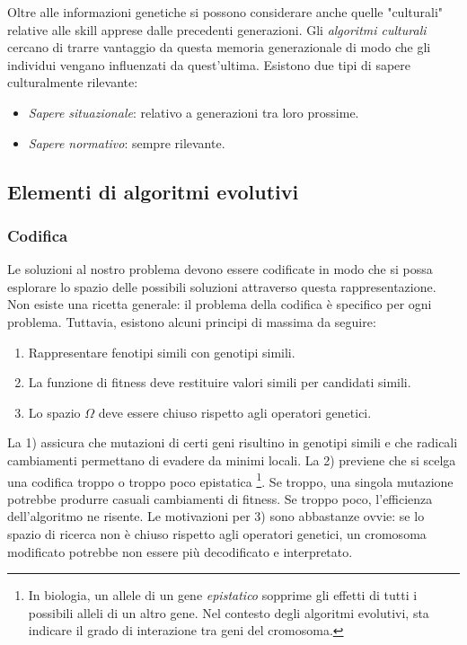 \documentclass[10pt,a4paper]{article}
\begin{document}
Oltre alle informazioni genetiche si possono considerare anche quelle "culturali" relative alle skill apprese dalle precedenti generazioni. Gli \emph{algoritmi culturali} cercano di trarre vantaggio da questa memoria generazionale di modo che gli individui vengano influenzati da quest'ultima. Esistono due tipi di sapere culturalmente rilevante:

\begin{itemize}
\item{\emph{Sapere situazionale}: relativo a generazioni tra loro prossime.}
\item{\emph{Sapere normativo}: sempre rilevante.}
\end{itemize}

\subsection{Elementi di algoritmi evolutivi}

\subsubsection{Codifica}

Le soluzioni al nostro problema devono essere codificate in modo che si possa esplorare lo spazio delle possibili soluzioni attraverso questa rappresentazione. Non esiste una ricetta generale: il problema della codifica è specifico per ogni problema. Tuttavia, esistono alcuni principi di massima da seguire:

\begin{enumerate}
\item{Rappresentare fenotipi simili con genotipi simili.}
\item{La funzione di fitness deve restituire valori simili per candidati simili.}
\item{Lo spazio $\Omega$ deve essere chiuso rispetto agli operatori genetici.}
\end{enumerate}

La 1) assicura che mutazioni di certi geni risultino in genotipi simili e che radicali cambiamenti permettano di evadere da minimi locali. La 2) previene che si scelga una codifica troppo o troppo poco epistatica \footnote{In biologia, un allele di un gene \emph{epistatico} sopprime gli effetti di tutti i possibili alleli di un altro gene. Nel contesto degli algoritmi evolutivi, sta indicare il grado di interazione tra geni del cromosoma.}. Se troppo, una singola mutazione potrebbe produrre casuali cambiamenti di fitness. Se troppo poco, l'efficienza dell'algoritmo ne risente. Le motivazioni per 3) sono abbastanze ovvie: se lo spazio di ricerca non è chiuso rispetto agli operatori genetici, un cromosoma modificato potrebbe non essere più decodificato e interpretato.  
\end{document}
